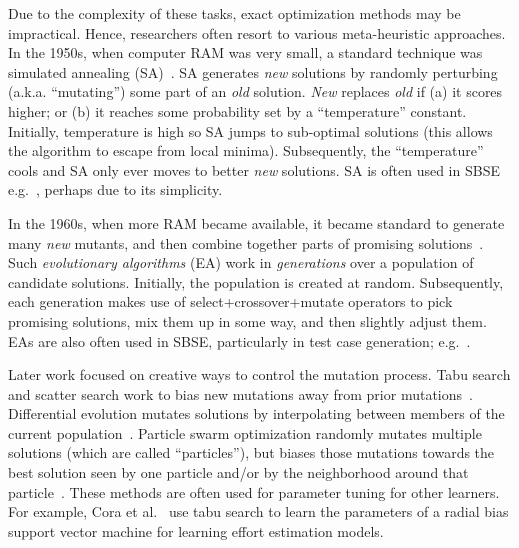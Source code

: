 \documentclass[10pt,journal,compsoc]{IEEEtran}
\begin{document}
Due to the complexity
of these tasks, exact optimization methods may be impractical.
Hence, researchers often resort to various meta-heuristic  approaches.
In the 1950s, when
computer RAM was very small, a standard technique was simulated
annealing (SA)~\cite{kirkpatrick83}. SA generates {\em new} solutions
by randomly perturbing (a.k.a. ``mutating'') some part of an {\em old}
solution.  {\em New} replaces {\em old} if (a) it scores higher; or
(b) it reaches some probability set by a ``temperature'' constant. Initially,
temperature is high so SA jumps to sub-optimal solutions (this allows
the algorithm to escape from local minima). Subsequently, the
``temperature'' cools and SA only ever moves to better {\em new}
solutions.
SA is often used in SBSE
e.g.~\cite{fea02a,me07f,me07g}, perhaps due to its simplicity.

In the 1960s, when more RAM became available, it became standard to
generate many {\em new} mutants, and then combine together parts of
promising solutions~\cite{goldberg79}.  Such {\em evolutionary
  algorithms} (EA) work in {\em generations} over a population of
candidate solutions.  Initially, the population is created at random.
Subsequently, each generation makes use of select+crossover+mutate
operators to pick promising solutions, mix them up in some way, and
then slightly adjust them.
EAs are also often used in SBSE, particularly in test case generation; e.g.~\cite{andrews07,andrews10}.

Later work focused on creative ways to control the
mutation process. Tabu search and scatter search
work to bias new mutations away from prior
mutations~\cite{Glover1986563,Beausoleil2006426,Molina05sspmo:a,4455350}.
Differential evolution mutates solutions by
interpolating between members of the current
population~\cite{storn97}.  Particle swarm
optimization randomly mutates multiple solutions
(which are called ``particles''), but biases those
mutations towards the best solution seen by one
particle and/or by the neighborhood around that
particle~\cite{pan08}.
These methods are often used for parameter tuning for other learners.
For example, Cora et al.~\cite{cora10} use tabu search to learn the parameters
of a radial bias support vector machine for learning effort estimation models.
\end{document}
